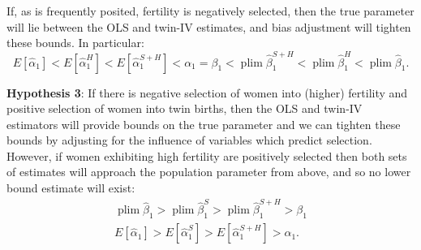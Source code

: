 \documentclass[subeqn]{article}
\DeclareMathOperator{\plim}{plim}
\begin{document}
\begin{spacing}{1.4}
If, as is frequently posited, fertility is negatively selected, then the true parameter will lie between the OLS and twin-IV estimates, and bias adjustment will tighten these bounds. In particular:
\[
E[\hat\alpha_1] < E[\hat\alpha_1^{H}] < E[\hat\alpha_1^{S+H}] < \alpha_1 =  \beta_1 < \plim\hat\beta_1^{S+H} < \plim\hat\beta_1^{H}<\plim\hat\beta_1.
\]

\noindent \textbf{Hypothesis 3}: If there is negative selection of women into (higher) fertility and positive selection of women into twin births, then the OLS and twin-IV estimators will provide bounds on the true parameter and we can tighten these bounds by adjusting for the influence of variables which predict selection.
\\
However, if women exhibiting high fertility are positively selected then both sets of estimates will approach the population parameter from above, and so
no lower bound estimate will exist:
\begin{eqnarray}
  \plim \hat\beta_1 > \plim\hat\beta_1^{S} > \plim\hat\beta_1^{S+H} > \beta_1 \nonumber \\
  E[\hat\alpha_1] > E[\hat\alpha_1^{S}] > E[\hat\alpha_1^{S+H}] > \alpha_1. \nonumber
\end{eqnarray}


\end{spacing}
\end{document}
